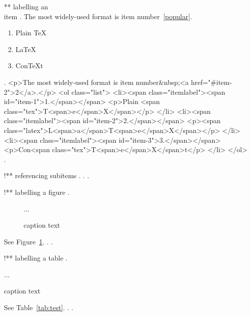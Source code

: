 ** labelling an \\item
.
The most widely-used format is item number~\ref{popular}.
\begin{enumerate}
    \item Plain \TeX
    \item \label{popular} \LaTeX
    \item Con\TeX t
\end{enumerate}
.
<p>The most widely‐used format is item number&nbsp;<a href="#item-2">2</a>.</p>
<ol class="list">
<li><span class="itemlabel"><span id="item-1">1.</span></span>
<p>Plain <span class="tex">T<span>e</span>X</span></p>
</li>
<li><span class="itemlabel"><span id="item-2">2.</span></span>
<p><span class="latex">L<span>a</span>T<span>e</span>X</span></p>
</li>
<li><span class="itemlabel"><span id="item-3">3.</span></span>
<p>Con<span class="tex">T<span>e</span>X</span>t</p>
</li>
</ol>
.



!** referencing subitems
.
.
.


!** labelling a figure
.
\begin{figure}
    ...
    \caption{caption text}
    \label{fig:test}
\end{figure}
See Figure~\ref{fig:test}.
.
.


!** labelling a table
.
\begin{table}
    ...
    \caption{caption text}
    \label{tab:test}
\end{table}
See Table~\ref{tab:test}.
.
.
